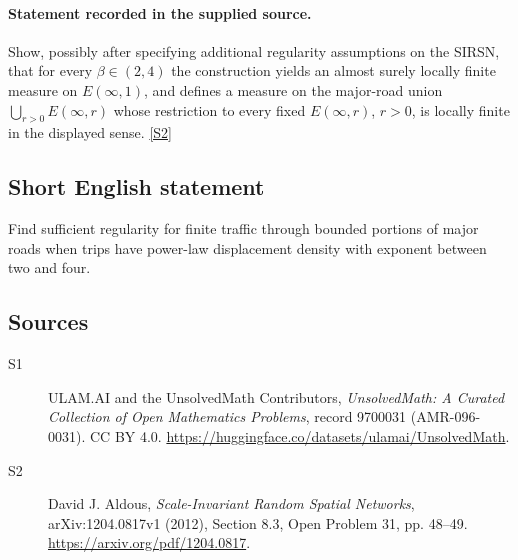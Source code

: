 \documentclass[11pt]{article}
\newcommand{\sref}[2]{\hyperlink{source:#1:#2}{[S#2]}}
\begin{document}
\paragraph{Statement recorded in the supplied source.}
Show, possibly after specifying additional regularity assumptions on the SIRSN, that for every $\beta\in(2,4)$ the construction yields an almost surely locally finite measure on $E(\infty,1)$, and defines a measure on the major-road union $\bigcup_{r>0}E(\infty,r)$ whose restriction to every fixed $E(\infty,r)$, $r>0$, is locally finite in the displayed sense. \sref{9700031}{2}
\subsection{Short English statement}
Find sufficient regularity for finite traffic through bounded portions of major roads when trips have power-law displacement density with exponent between two and four.
\subsection{Sources}
\begin{description}
\item[\hypertarget{source:9700031:1}{S1}] ULAM.AI and the UnsolvedMath Contributors, \emph{UnsolvedMath: A Curated Collection of Open Mathematics Problems}, record 9700031 (AMR-096-0031). CC BY 4.0. \url{https://huggingface.co/datasets/ulamai/UnsolvedMath}.
\item[\hypertarget{source:9700031:2}{S2}] David J. Aldous, \emph{Scale-Invariant Random Spatial Networks}, arXiv:1204.0817v1 (2012), Section 8.3, Open Problem 31, pp. 48--49. \url{https://arxiv.org/pdf/1204.0817}.
\end{description}
\label{end:9700031}
\end{document}
